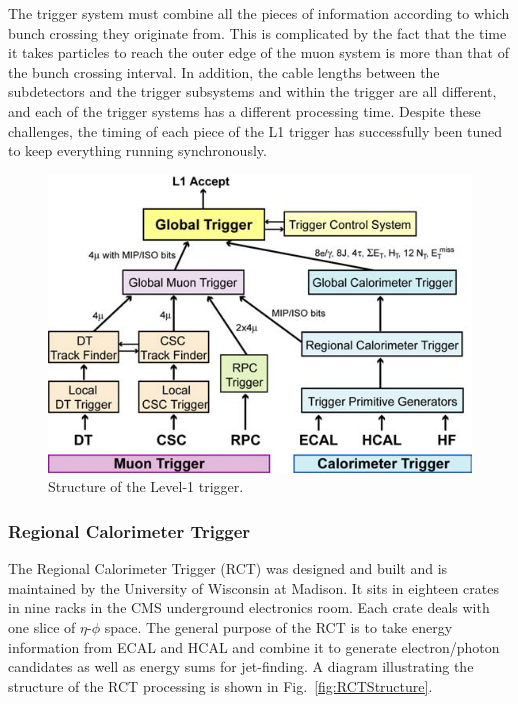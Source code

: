 The trigger system must combine all the pieces of information 
according to which bunch crossing they originate from.   
This is complicated by the fact that the time it takes particles 
to reach the outer edge of the muon system 
is 
more than %
that of the bunch crossing interval.  
In addition, the cable lengths between the subdetectors 
and the trigger subsystems and within the trigger are 
all different, 
and each of the trigger systems has a different processing time.  
Despite these challenges, the timing of each piece of 
the L1 trigger has successfully been tuned to keep everything running 
synchronously.  



 \begin{figure}[htb]
  \begin{center}
    \includegraphics[width=360pt]{Figures/L1structure.png}
  \end{center}
  \caption[\fixspacing Structure of the Level-1 trigger]
	  {\fixspacing Structure of the Level-1 trigger.}
  \label{fig:L1Structure}
 \end{figure}

\subsubsection{Regional Calorimeter Trigger}
\label{exp:RCT}
The Regional Calorimeter Trigger (RCT) \cite{rctTriggerSystem}
was designed and built and is maintained 
by the University of Wisconsin at Madison.  
It sits in eighteen crates in nine racks in the CMS underground electronics room.  
Each crate deals with one slice of $\eta$-$\phi$ space.  
The general purpose of the RCT is to take 
energy information from ECAL and HCAL and combine it 
to generate electron/photon candidates as well as energy sums for 
jet-finding.  
A diagram illustrating the structure of the RCT processing 
is shown in Fig.~\ref{fig:RCTStructure}.  

